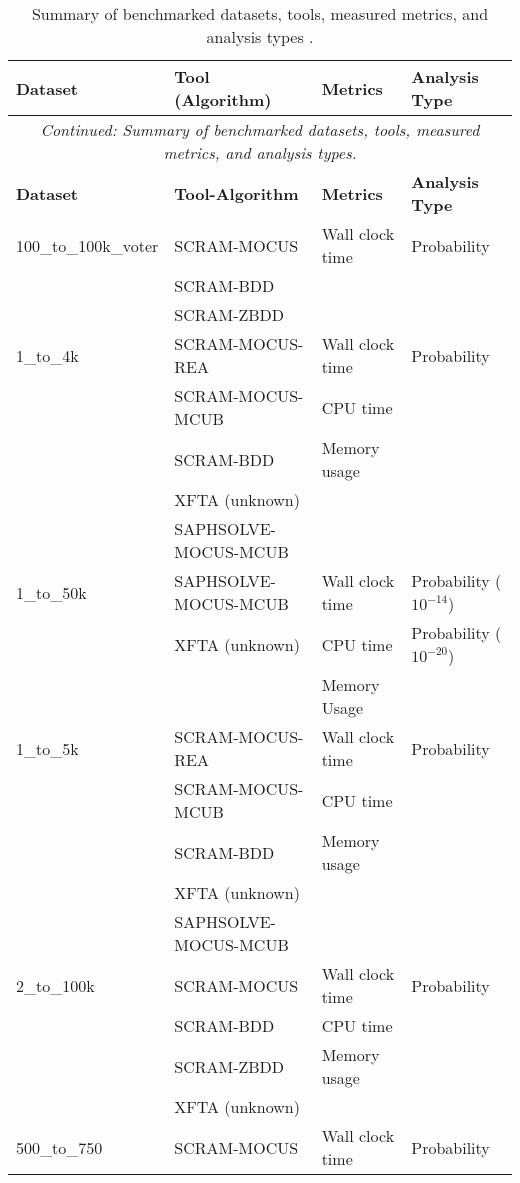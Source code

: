\begin{longtable}{llll}
\caption{Summary of benchmarked datasets, tools, measured metrics, and analysis types \cite{earthperson_dataset_2023}.}
\label{tab:what_was_benchmarked}\\
\toprule
\textbf{Dataset} & \textbf{Tool (Algorithm)} & \textbf{Metrics} & \textbf{Analysis Type} \\
\midrule
\endfirsthead
\multicolumn{4}{c}{\textit{Continued: Summary of benchmarked datasets, tools, measured metrics, and analysis types.}}\\
\toprule
\textbf{Dataset} & \textbf{Tool-Algorithm} & \textbf{Metrics} & \textbf{Analysis Type} \\
\midrule
\endhead
%
\bottomrule
\endfoot
%
\endlastfoot

100\_to\_100k\_voter
    & SCRAM-MOCUS & Wall clock time & Probability \\
    & SCRAM-BDD & & \\
    & SCRAM-ZBDD & & \\
\midrule
1\_to\_4k
    & SCRAM-MOCUS-REA & Wall clock time & Probability \\
    & SCRAM-MOCUS-MCUB & CPU time  &  \\
    & SCRAM-BDD &  Memory usage &  \\
    & XFTA (unknown) &  &  \\
    & SAPHSOLVE-MOCUS-MCUB &  &  \\
\midrule
1\_to\_50k
    & SAPHSOLVE-MOCUS-MCUB & Wall clock time & Probability ($10^{-14}$) \\
    & XFTA (unknown) &  CPU time &  Probability ($10^{-20}$) \\
    &  & Memory Usage & \\
\midrule
1\_to\_5k
    & SCRAM-MOCUS-REA & Wall clock time & Probability \\
    & SCRAM-MOCUS-MCUB & CPU time &  \\
    & SCRAM-BDD & Memory usage &  \\
    & XFTA (unknown) &  &  \\
    & SAPHSOLVE-MOCUS-MCUB &  &  \\
\midrule
2\_to\_100k
    & SCRAM-MOCUS & Wall clock time & Probability \\
    & SCRAM-BDD & CPU time &  \\
    & SCRAM-ZBDD & Memory usage &  \\
    & XFTA (unknown) &  &  \\
\midrule
500\_to\_750
    & SCRAM-MOCUS & Wall clock time & Probability \\

\end{longtable}
